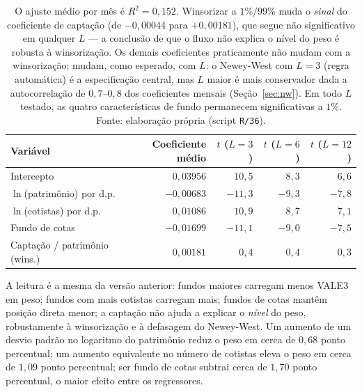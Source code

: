 \documentclass[12pt,a4paper]{article}
\begin{document}
\begin{table}[h]\centering\small
\caption{Regressão do peso mês a mês, resumo Fama--MacBeth (72 meses), captação
\textbf{winsorizada} (1\%/99\%) --- especificação principal desta versão --- com sensibilidade
do Newey-West à defasagem $L$.}
\label{tab:fmtab}
\begin{tabular}{@{}lrrrr@{}}
\toprule
Variável & Coeficiente médio & $t$ ($L=3$) & $t$ ($L=6$) & $t$ ($L=12$) \\
\midrule
Intercepto                    & $0{,}03956$  & $10{,}5$ & $8{,}3$ & $6{,}6$ \\
$\ln$(patrimônio) por d.p.    & $-0{,}00683$ & $-11{,}3$ & $-9{,}3$ & $-7{,}8$ \\
$\ln$(cotistas) por d.p.      & $0{,}01086$  & $10{,}9$ & $8{,}7$ & $7{,}1$ \\
Fundo de cotas                & $-0{,}01699$ & $-11{,}1$ & $-9{,}0$ & $-7{,}5$ \\
Captação / patrimônio (wins.) & $0{,}00181$  & $0{,}4$ & $0{,}4$ & $0{,}3$ \\
\bottomrule
\end{tabular}
\caption*{\footnotesize O ajuste médio por mês é $R^2=0{,}152$. Winsorizar a $1\%/99\%$ muda o
\emph{sinal} do coeficiente de captação (de $-0{,}00044$ para $+0{,}00181$), que segue não
significativo em qualquer $L$ --- a conclusão de que o fluxo não explica o nível do peso é
robusta à winsorização. Os demais coeficientes praticamente não mudam com a winsorização; mudam,
como esperado, com $L$: o Newey-West com $L=3$ (regra automática) é a especificação central, mas
$L$ maior é mais conservador dada a autocorrelação de $0{,}7$--$0{,}8$ dos coeficientes mensais
(Seção~\ref{sec:nw}). Em todo $L$ testado, as quatro características de fundo permanecem
significativas a $1\%$. Fonte: elaboração própria (script \texttt{R/36}).}
\end{table}

A leitura é a mesma da versão anterior: fundos maiores carregam menos VALE3 em peso; fundos com
mais cotistas carregam mais; fundos de cotas mantêm posição direta menor; a captação não ajuda a
explicar o \emph{nível} do peso, robustamente à winsorização e à defasagem do Newey-West. Um
aumento de um desvio padrão no logaritmo do patrimônio reduz o peso em cerca de $0{,}68$ ponto
percentual; um aumento equivalente no número de cotistas eleva o peso em cerca de $1{,}09$ ponto
percentual; ser fundo de cotas subtrai cerca de $1{,}70$ ponto percentual, o maior efeito entre
os regressores.
\end{document}
